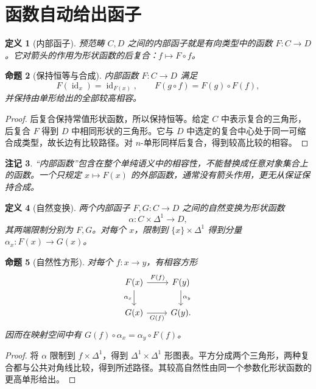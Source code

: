 \documentclass[12pt,oneside,openany,fontset=none]{ctexbook}
\theoremstyle{cn}
\newtheorem{definition}{定义}[chapter]
\newtheorem{proposition}[definition]{命题}
\newtheorem{remark}[definition]{注记}
\numberwithin{equation}{chapter}
\newcommand{\id}{\operatorname{id}}
\begin{document}
\section{函数自动给出函子}
\begin{definition}[内部函子]
预范畴 $C,D$ 之间的内部函子就是有向类型中的函数 $F:C\to D$。它对箭头的作用为形状函数的后复合：$f\mapsto F\circ f$。
\end{definition}
\begin{proposition}[保持恒等与合成]
内部函数 $F:C\to D$ 满足
\[
F(\id_x)=\id_{F(x)},
\qquad
F(g\circ f)=F(g)\circ F(f),
\]
并保持由单形给出的全部较高相容。
\end{proposition}
\begin{proof}
后复合保持常值形状函数，所以保持恒等。给定 $C$ 中表示复合的三角形，后复合 $F$ 得到 $D$ 中相同形状的三角形。它与 $D$ 中选定的复合中心处于同一可缩合成类型，故长边有比较路径。对 $n$-单形同样后复合，得到较高比较的相容。
\end{proof}
\begin{remark}
“内部函数”包含在整个单纯语义中的相容性，不能替换成任意对象集合上的函数。一个只规定 $x\mapsto F(x)$ 的外部函数，通常没有箭头作用，更无从保证保持合成。
\end{remark}
\begin{definition}[自然变换]
两个内部函子 $F,G:C\to D$ 之间的自然变换为形状函数
\[
\alpha:C\times\Delta^1\longrightarrow D,
\]
其两端限制分别为 $F,G$。对每个 $x$，限制到 $\{x\}\times\Delta^1$ 得到分量 $\alpha_x:F(x)\to G(x)$。
\end{definition}
\begin{proposition}[自然性方形]
对每个 $f:x\to y$，有相容方形
\[
\begin{tikzcd}
F(x)\ar[r,"F(f)"]\ar[d,"\alpha_x"']&F(y)\ar[d,"\alpha_y"]\\
G(x)\ar[r,"G(f)"']&G(y).
\end{tikzcd}
\]
因而在映射空间中有 $G(f)\circ\alpha_x=\alpha_y\circ F(f)$。
\end{proposition}
\begin{proof}
将 $\alpha$ 限制到 $f\times\Delta^1$，得到 $\Delta^1\times\Delta^1$ 形图表。平方分成两个三角形，两种复合都与公共对角线比较，得到所述路径。其较高自然性由同一个参数化形状函数的更高单形给出。
\end{proof}
\end{document}

